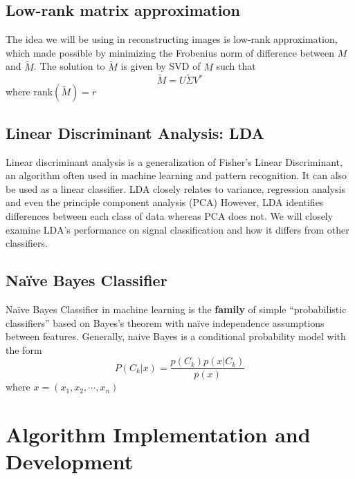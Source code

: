 \documentclass[11pt,a4paper]{article}
\numberwithin{equation}{subsection}
\begin{document}
\subsection{Low-rank matrix approximation}
The idea we will be using in reconstructing images is low-rank approximation, which made possible by minimizing the Frobenius norm of difference between $M$ and $\tilde{M}$. The solution to $\tilde{M}$ is given by SVD of $M$ such that \cite{svd}
\begin{equation}
\tilde{M}=U\tilde{\Sigma}V^*
\end{equation}
where rank$(\tilde{M})=r$
\subsection{Linear Discriminant Analysis: LDA}
Linear discriminant analysis is a generalization of Fisher's Linear Discriminant, an algorithm often used in machine learning and pattern recognition. It can also be used as a linear classifier. LDA closely relates to variance, regression analysis and even the principle component analysis (PCA) However, LDA identifies differences between each class of data whereas PCA does not.\cite{lda} We will closely examine LDA's performance on signal classification and how it differs from other classifiers.
\subsection{Na\"ive Bayes Classifier}
Na\"ive Bayes Classifier in machine learning is the \textbf{family} of simple ``probabilistic classifiers'' based on Bayes's theorem with na\"ive independence assumptions between features. Generally, naive Bayes is a conditional probability model with the form \cite{nbc}
\begin{equation}
P(C_k|x)=\frac{p(C_k)p(x|C_k)}{p(x)}
\end{equation}
where $x=(x_1, x_2, \cdots, x_n)$

\section{Algorithm Implementation and Development}
\end{document}
